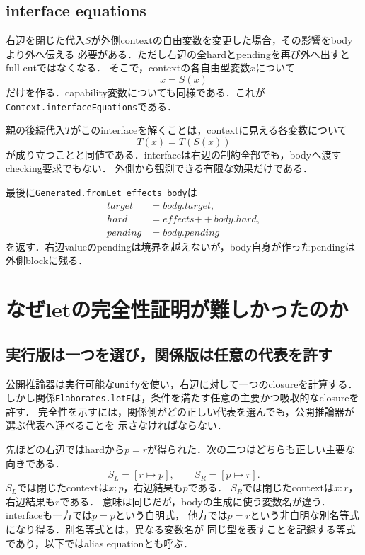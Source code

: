 \documentclass[11pt,a4paper,oneside]{ltjsbook}
\newcommand{\code}[1]{\texttt{#1}}
\begin{document}
\section{interface equations}

右辺を閉じた代入$S$が外側contextの自由変数を変更した場合，その影響をbodyより外へ伝える
必要がある．ただし右辺の全hardとpendingを再び外へ出すとfull-cutではなくなる．
そこで，contextの各自由型変数$x$について
\[
  x = S(x)
\]
だけを作る．capability変数についても同様である．これが
\code{Context.interfaceEquations}である．

親の後続代入$T$がこのinterfaceを解くことは，contextに見える各変数について
\[
  T(x)=T(S(x))
\]
が成り立つことと同値である．interfaceは右辺の制約全部でも，bodyへ渡すchecking要求でもない．
外側から観測できる有限な効果だけである．

最後に\code{Generated.fromLet effects body}は
\[
\begin{aligned}
  \mathit{target} &= \mathit{body.target},\\
  \mathit{hard} &= \mathit{effects}\mathbin{+\!+}\mathit{body.hard},\\
  \mathit{pending} &= \mathit{body.pending}
\end{aligned}
\]
を返す．右辺valueのpendingは境界を越えないが，body自身が作ったpendingは外側blockに残る．

\chapter{なぜletの完全性証明が難しかったのか}

\section{実行版は一つを選び，関係版は任意の代表を許す}

公開推論器は実行可能な\code{unify}を使い，右辺に対して一つのclosureを計算する．
しかし関係\code{Elaborates.letE}は，条件を満たす任意の主要かつ吸収的なclosureを許す．
完全性を示すには，関係側がどの正しい代表を選んでも，公開推論器が選ぶ代表へ運べることを
示さなければならない．

先ほどの右辺ではhardから$p=r$が得られた．次の二つはどちらも正しい主要な向きである．
\[
  S_L=[r\mapsto p],\qquad S_R=[p\mapsto r].
\]
$S_L$では閉じたcontextは$x:p$，右辺結果も$p$である．
$S_R$では閉じたcontextは$x:r$，右辺結果も$r$である．
意味は同じだが，bodyの生成に使う変数名が違う．interfaceも一方では$p=p$という自明式，
他方では$p=r$という非自明な別名等式になり得る．別名等式とは，異なる変数名が
同じ型を表すことを記録する等式であり，以下ではalias equationとも呼ぶ．
\end{document}
